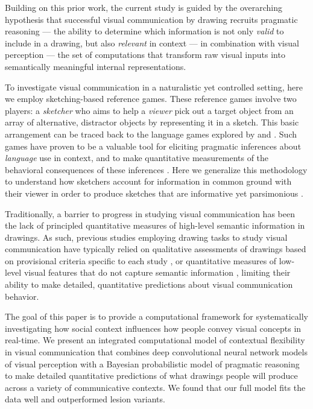 \documentclass[9pt,twocolumn,twoside]{pnas-new}
\begin{document}
Building on this prior work, the current study is guided by the overarching hypothesis that successful visual communication by drawing recruits pragmatic reasoning \cite{goodman2016pragmatic,clark1996using,wilson1986relevance,grice1975syntax} --- the ability to determine which information is not only \textit{valid} to include in a drawing, but also \textit{relevant} in context --- in combination with visual perception --- the set of computations that transform raw visual inputs into semantically meaningful internal representations.

To investigate visual communication in a naturalistic yet controlled setting, here we employ sketching-based reference games. These reference games involve two players: a \textit{sketcher} who aims to help a \textit{viewer} pick out a target object from an array of alternative, distractor objects by representing it in a sketch. This basic arrangement can be traced back to the language games explored by \citep{wittgenstein1953philosophical} and \citep{Lewis69_Convention}. Such games have proven to be a valuable tool for eliciting pragmatic inferences about \textit{language} use in context, and to make quantitative measurements of the behavioral consequences of these inferences \cite{goodman2016pragmatic,kao2014formalizing,goodman2013knowledge,frank2012predicting}. Here we generalize this methodology to understand how sketchers account for information in common ground with their viewer in order to produce sketches that are informative \cite{grice1975syntax,wilson1986relevance} yet parsimonious \cite{zipf1936psycho}.

Traditionally, a barrier to progress in studying visual communication has been the lack of principled quantitative measures of high-level semantic information in drawings. As such, previous studies employing drawing tasks to study visual communication have typically relied on qualitative assessments of drawings based on provisional criteria specific to each study \cite{Healey:2007vq}, or quantitative measures of low-level visual features that do not capture semantic information \cite{Garrod:2007wk}, limiting their ability to make detailed, quantitative predictions about visual communication behavior.

The goal of this paper is to provide a computational framework for systematically investigating how social context influences how people convey visual concepts in real-time. We present an integrated computational model of contextual flexibility in visual communication that combines deep convolutional neural network models of visual perception with a Bayesian probabilistic model of pragmatic reasoning \cite{goodman2016pragmatic} to make detailed quantitative predictions of what drawings people will produce across a variety of communicative contexts. We found that our full model fits the data well and outperformed lesion variants.
\end{document}
